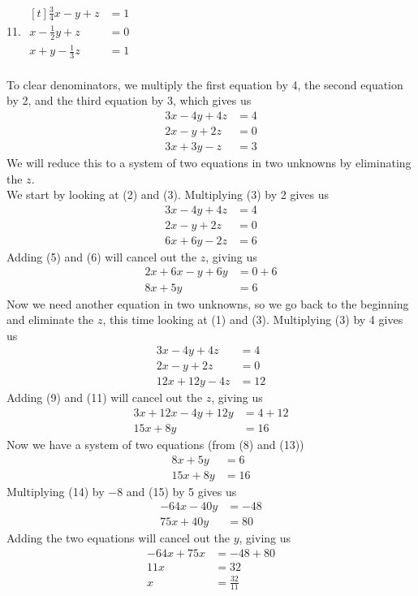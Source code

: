 \documentclass[12pt]{article}
\begin{document}
\setcounter{equation}{0}
11. $\begin{aligned}[t]
\frac{3}{4}x-y+z&=1 \\
x-\frac{1}{2}y+z&=0 \\
x+y-\frac{1}{3}z&=1
\end{aligned}$ \\
\\
To clear denominators, we multiply the first equation by 4, the second equation by 2, and the third equation by 3, which gives us
\begin{align}
3x-4y+4z&=4 \\
2x-y+2z&=0 \\
3x+3y-z&=3
\end{align}
We will reduce this to a system of two equations in two unknowns by eliminating the $z$. \\
We start by looking at (2) and (3). Multiplying (3) by 2 gives us
\begin{align}
3x-4y+4z&=4 \\
2x-y+2z&=0 \\
6x+6y-2z&=6
\end{align}
Adding (5) and (6) will cancel out the $z$, giving us
\begin{align}
2x+6x-y+6y&=0+6 \\
8x+5y&=6
\end{align}
Now we need another equation in two unknowns, so we go back to the beginning and eliminate the $z$, this time looking at (1) and (3). Multiplying (3) by 4 gives us
\begin{align}
3x-4y+4z&=4 \\
2x-y+2z&=0 \\
12x+12y-4z&=12
\end{align}
Adding (9) and (11) will cancel out the $z$, giving us
\begin{align}
3x+12x-4y+12y&=4+12 \\
15x+8y&=16
\end{align}
Now we have a system of two equations (from (8) and (13))
\begin{align}
8x+5y&=6 \\
15x+8y&=16
\end{align}
Multiplying (14) by $-8$ and (15) by 5 gives us
\begin{align*}
-64x-40y&=-48 \\
75x+40y&=80
\end{align*}
Adding the two equations will cancel out the $y$, giving us
\begin{align*}
-64x+75x&=-48+80 \\
11x&=32 \\
x&=\displaystyle \frac{32}{11}
\end{align*}
\end{document}
